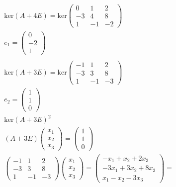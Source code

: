 		\begin{gather*}
			\text{ker}(A + 4E) = \text{ker}
			\begin{pmatrix}
				0 & 1 & 2\\
				-3 & 4 & 8\\
				1 & -1 & -2
			\end{pmatrix}
			\\
			e_1 = 
			\begin{pmatrix}
				0 \\ -2 \\ 1
			\end{pmatrix}\\
			\\
			\text{ker}(A + 3E) = \text{ker}
			\begin{pmatrix}
				-1 & 1 & 2\\
				-3 & 3 & 8\\
				1 & -1 & -3
			\end{pmatrix}
			\\
			e_2 = 
			\begin{pmatrix}
				1 \\ 1 \\ 0
			\end{pmatrix}
			\\
			\text{ker}(A + 3E)^2\\
			(A + 3E) 
			\begin{pmatrix}
				x_1 \\ x_2 \\ x_3
			\end{pmatrix}
			=
			\begin{pmatrix}
				1 \\ 1 \\ 0
			\end{pmatrix}
			\\
			\begin{pmatrix}
				-1 & 1 & 2\\
				-3 & 3 & 8\\
				1 & -1 & -3
			\end{pmatrix}
			\begin{pmatrix}
				x_1 \\ x_2 \\ x_3
			\end{pmatrix}
			= 
			\begin{pmatrix}
				-x_1 + x_2 + 2x_3\\
				-3x_1 + 3x_2 + 8x_3\\
				x_1 - x_2 - 3x_3
			\end{pmatrix}
			=\\ 

\end{gather*}
